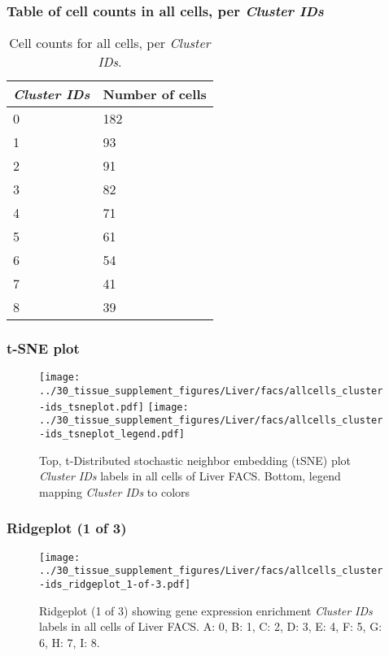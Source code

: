 \subsubsection{Table of cell counts in all cells, per \emph{Cluster IDs}}\begin{table}[h]
\centering
\label{my-label}
\begin{tabular}{@{}ll@{}}
\toprule

\emph{Cluster IDs}& Number of cells \\ \midrule
0 & 182 \\

1 & 93 \\

2 & 91 \\

3 & 82 \\

4 & 71 \\

5 & 61 \\

6 & 54 \\

7 & 41 \\

8 & 39 \\
\bottomrule
\end{tabular}
\caption{Cell counts for all cells, per \emph{Cluster IDs}.}
\end{table}

\clearpage
\subsubsection{t-SNE plot}
\begin{figure}[h]
\centering
\texttt{[image: ../30\_tissue\_supplement\_figures/Liver/facs/allcells\_cluster-ids\_tsneplot.pdf]}
\texttt{[image: ../30\_tissue\_supplement\_figures/Liver/facs/allcells\_cluster-ids\_tsneplot\_legend.pdf]}
\caption{Top, t-Distributed stochastic neighbor embedding (tSNE) plot  \emph{Cluster IDs} labels in all cells of Liver FACS. Bottom, legend mapping \emph{Cluster IDs} to colors}
\end{figure}


\clearpage

\subsubsection{Ridgeplot (1 of 3)}
\begin{figure}[h]
\centering
\texttt{[image: ../30\_tissue\_supplement\_figures/Liver/facs/allcells\_cluster-ids\_ridgeplot\_1-of-3.pdf]}

\caption{ Ridgeplot (1 of 3)  showing gene expression enrichment \emph{Cluster IDs} labels in all cells of Liver FACS. A: 0, B: 1, C: 2, D: 3, E: 4, F: 5, G: 6, H: 7, I: 8.}
\end{figure}


